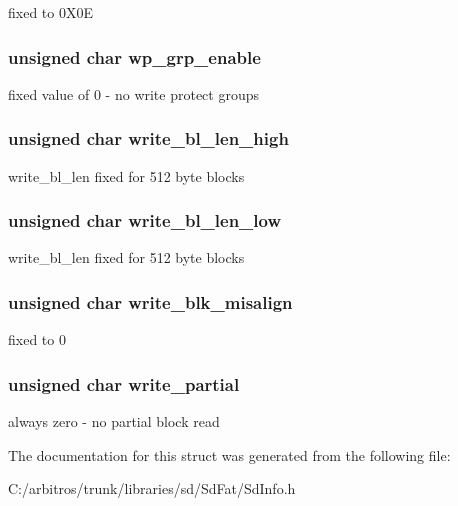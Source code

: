 fixed to 0\-X0\-E \hypertarget{struct_c_s_d_v2_ab4247b023129bd89e0cebe8508b35f0a}{
\subsubsection[{wp\-\_\-grp\-\_\-enable}]{\setlength{\rightskip}{0pt plus 5cm}unsigned char wp\-\_\-grp\-\_\-enable}}\label{struct_c_s_d_v2_ab4247b023129bd89e0cebe8508b35f0a}
fixed value of 0 -\/ no write protect groups \hypertarget{struct_c_s_d_v2_af31036ae33a6db8cf3db322fef249b48}{
\subsubsection[{write\-\_\-bl\-\_\-len\-\_\-high}]{\setlength{\rightskip}{0pt plus 5cm}unsigned char write\-\_\-bl\-\_\-len\-\_\-high}}\label{struct_c_s_d_v2_af31036ae33a6db8cf3db322fef249b48}
write\-\_\-bl\-\_\-len fixed for 512 byte blocks \hypertarget{struct_c_s_d_v2_ad61c0325b9602bdb15cf59b69fc4a67f}{
\subsubsection[{write\-\_\-bl\-\_\-len\-\_\-low}]{\setlength{\rightskip}{0pt plus 5cm}unsigned char write\-\_\-bl\-\_\-len\-\_\-low}}\label{struct_c_s_d_v2_ad61c0325b9602bdb15cf59b69fc4a67f}
write\-\_\-bl\-\_\-len fixed for 512 byte blocks \hypertarget{struct_c_s_d_v2_a5fd0cab21c874fd49fc4ea5d537be201}{
\subsubsection[{write\-\_\-blk\-\_\-misalign}]{\setlength{\rightskip}{0pt plus 5cm}unsigned char write\-\_\-blk\-\_\-misalign}}\label{struct_c_s_d_v2_a5fd0cab21c874fd49fc4ea5d537be201}
fixed to 0 \hypertarget{struct_c_s_d_v2_a062890f25943538976760e7db822a635}{
\subsubsection[{write\-\_\-partial}]{\setlength{\rightskip}{0pt plus 5cm}unsigned char write\-\_\-partial}}\label{struct_c_s_d_v2_a062890f25943538976760e7db822a635}
always zero -\/ no partial block read 

The documentation for this struct was generated from the following file\-:\begin{DoxyCompactItemize}
\item 
C\-:/arbitros/trunk/libraries/sd/\-Sd\-Fat/Sd\-Info.\-h\end{DoxyCompactItemize}

